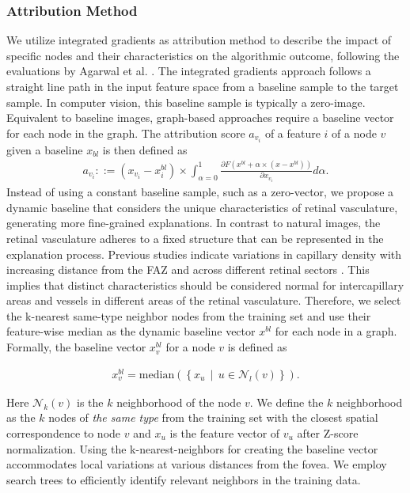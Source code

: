 \subsubsection{Attribution Method}
We utilize integrated gradients \cite{sundararajan2017axiomatic, mccloskey2019using} as attribution method to describe the impact of specific nodes and their characteristics on the algorithmic outcome, following the evaluations by Agarwal et al. \cite{agarwal2023evaluating}. The integrated gradients approach follows a straight line path in the input feature space from a baseline sample to the target sample. In computer vision, this baseline sample is typically a zero-image. Equivalent to baseline images, graph-based approaches require a baseline vector for each node in the graph. The attribution score $a_{v_i}$ of a feature $i$ of a node $v$ given a baseline $x_{bl}$ is then defined as 
\begin{align}
a_{v_i}::=(x_{v_i}-x^{bl}_i)\times\int_{\alpha=0}^{1}{\frac{\partial F(x^{bl}+\alpha\times(x-x^{bl}))}{\partial x_{v_i}}}d\alpha .   
\end{align}
Instead of using a constant baseline sample, such as a zero-vector, we propose a dynamic baseline \cite{sturmfels2020visualizing} that considers the unique characteristics of retinal vasculature, generating more fine-grained explanations. In contrast to natural images, the retinal vasculature adheres to a fixed structure that can be represented in the explanation process. Previous studies indicate variations in capillary density with increasing distance from the FAZ and across different retinal sectors \cite{lavia2020retinal}. This implies that distinct characteristics should be considered normal for intercapillary areas and vessels in different areas of the retinal vasculature. Therefore, we select the k-nearest same-type neighbor nodes from the training set and use their feature-wise median as the dynamic baseline vector $x^{bl}$ for each node in a graph. Formally, the baseline vector $x_v^{bl}$ for a node $v$ is defined as

\begin{align}
    x_{v}^{bl} = \text{{median}}\left(\left\{ x_{u} \, \middle| \, u \in \mathcal{N}_l(v) \right\}\right).
\end{align}

Here $\mathcal{N}_k(v)$ is the $k$ neighborhood of the node $v$. We define the $k$ neighborhood as the $k$ nodes of \textit{the same type} from the training set with the closest spatial correspondence to node $v$ and $x_u$ is the feature vector of $v_u$ after Z-score normalization. Using the k-nearest-neighbors for creating the baseline vector accommodates local variations at various distances from the fovea. We employ search trees to efficiently identify relevant neighbors in the training data.


